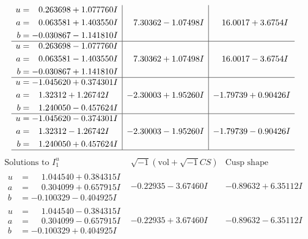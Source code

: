 \documentclass[1p]{elsarticle_modified}
\theoremstyle{definition}
\newcommand{\I}{\sqrt{-1}}
\begin{document}
$$\begin{array}{c|c|c}
\begin{aligned}
u &= \phantom{-}0.263698 + 1.077760 I \\
a &= \phantom{-}0.063581 + 1.403550 I \\
b &= -0.030867 - 1.141810 I\end{aligned}
 & \phantom{-}7.30362 - 1.07498 I & \phantom{-}16.0017 + 3.6754 I \\ \hline\begin{aligned}
u &= \phantom{-}0.263698 - 1.077760 I \\
a &= \phantom{-}0.063581 - 1.403550 I \\
b &= -0.030867 + 1.141810 I\end{aligned}
 & \phantom{-}7.30362 + 1.07498 I & \phantom{-}16.0017 - 3.6754 I \\ \hline\begin{aligned}
u &= -1.045620 + 0.374301 I \\
a &= \phantom{-}1.32312 + 1.26742 I \\
b &= \phantom{-}1.240050 - 0.457624 I\end{aligned}
 & -2.30003 + 1.95260 I & -1.79739 + 0.90426 I \\ \hline\begin{aligned}
u &= -1.045620 - 0.374301 I \\
a &= \phantom{-}1.32312 - 1.26742 I \\
b &= \phantom{-}1.240050 + 0.457624 I\end{aligned}
 & -2.30003 - 1.95260 I & -1.79739 - 0.90426 I\\
 \hline 
 \end{array}$$\newpage$$\begin{array}{c|c|c}  
\text{Solutions to }I^u_{1}& \I (\text{vol} + \sqrt{-1}CS) & \text{Cusp shape}\\
 \hline 
\begin{aligned}
u &= \phantom{-}1.044540 + 0.384315 I \\
a &= \phantom{-}0.304099 + 0.657915 I \\
b &= -0.100329 - 0.404925 I\end{aligned}
 & -0.22935 - 3.67460 I & -0.89632 + 6.35112 I \\ \hline\begin{aligned}
u &= \phantom{-}1.044540 - 0.384315 I \\
a &= \phantom{-}0.304099 - 0.657915 I \\
b &= -0.100329 + 0.404925 I\end{aligned}
 & -0.22935 + 3.67460 I & -0.89632 - 6.35112 I \\ \hline\begin{aligned}

\end{aligned}
\end{array}$$
\end{document}

